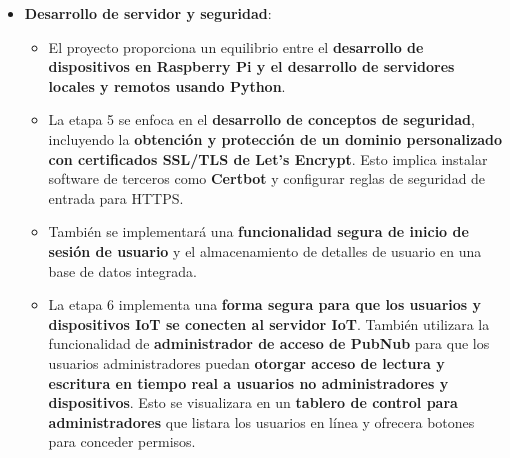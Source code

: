\documentclass{report}
\begin{document}
\begin{itemize}
    \item \textbf{Desarrollo de servidor y seguridad}:
    \begin{itemize}
        \item El proyecto proporciona un equilibrio entre el \textbf{desarrollo de dispositivos en Raspberry Pi y el desarrollo de 
        servidores locales y remotos usando Python}.
        \item La etapa 5 se enfoca en el \textbf{desarrollo de conceptos de seguridad}, incluyendo la \textbf{obtención y protección 
        de un dominio personalizado con certificados SSL/TLS de Let's Encrypt}. Esto implica instalar software de terceros como 
        \textbf{Certbot} y configurar reglas de seguridad de entrada para HTTPS.
        \item También se implementará una \textbf{funcionalidad segura de inicio de sesión de usuario} y el almacenamiento de detalles de 
        usuario en una base de datos integrada.
        \item La etapa 6 implementa una \textbf{forma segura para que los usuarios y dispositivos IoT se conecten al servidor IoT}. 
        También utilizara la funcionalidad de \textbf{administrador de acceso de PubNub} para que los usuarios administradores puedan 
        \textbf{otorgar acceso de lectura y escritura en tiempo real a usuarios no administradores y dispositivos}. Esto se visualizara en 
        un \textbf{tablero de control para administradores} que listara los usuarios en línea y ofrecera botones para conceder permisos.
    \end{itemize}
\end{itemize}
\end{document}
